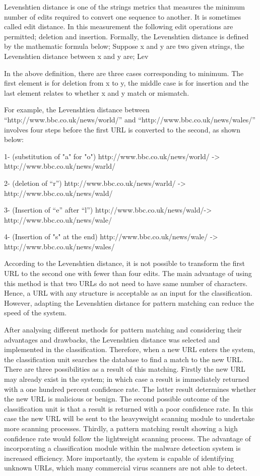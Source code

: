 Levenshtien distance is one of the strings metrics that measures the minimum number of edits required to convert one sequence to another. It is sometimes called edit distance. In this measurement the following edit operations are permitted; deletion and insertion. 
Formally, the Levenshtien distance is defined by the mathematic formula below;
Suppose x and y are two given strings, the Levenshtien distance between x and y are;
Lev

In the above definition, there are three cases corresponding to minimum. The first element is for deletion from x to y, the middle case is for insertion and the last element relates to whether x and y match or mismatch\cite{Levenshtein}.  

For example, the Levenshtien distance between “http://www.bbc.co.uk/news/world/” and “http://www.bbc.co.uk/news/wales/” involves four steps before the first URL is converted to the second, as shown below:

1-	(substitution of "a" for "o")
http://www.bbc.co.uk/news/world/ -> http://www.bbc.co.uk/news/warld/

2-	(deletion of “r”)
http://www.bbc.co.uk/news/warld/ -> http://www.bbc.co.uk/news/wald/

3-	(Insertion of “e” after “l”)
http://www.bbc.co.uk/news/wald/-> http://www.bbc.co.uk/news/wale/

4-	(Insertion of "s" at the end)
http://www.bbc.co.uk/news/wale/ -> http://www.bbc.co.uk/news/wales/

According to the Levenshtien distance, it is not possible to transform the first URL to the second one with fewer than four edits. The main advantage of using this method is that two URLs do not need to have same number of characters. Hence, a URL with any structure is acceptable as an input for the classification. However, adapting the Levenshtien distance for pattern matching can reduce the speed of the system.

After analysing different methods for pattern matching and considering their advantages and drawbacks, the Levenshtien distance was selected and implemented in the classification.  Therefore, when a new URL enters the system, the classification unit searches the database to find a match to the new URL. There are three possibilities as a result of this matching. Firstly the new URL may already exist in the system; in which case a result is immediately returned with a one hundred percent confidence rate. The latter result determines whether the new URL is malicious or benign. The second possible outcome of the classification unit is that a result is returned with a poor confidence rate. In this case the new URL will be sent to the heavyweight scanning module to undertake more scanning processes. Thirdly, a pattern matching result showing a high confidence rate would follow the lightweight scanning process.
The advantage of incorporating a classification module within the malware detection system is increased efficiency. More importantly, the system is capable of identifying unknown URLs, which many commercial virus scanners are not able to detect. 
